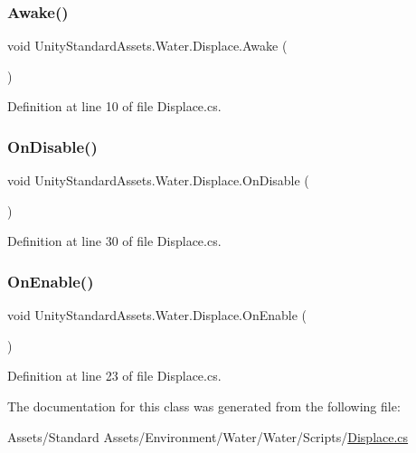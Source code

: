 \subsubsection{\texorpdfstring{Awake()}{Awake()}}
{\footnotesize\ttfamily void Unity\+Standard\+Assets.\+Water.\+Displace.\+Awake (\begin{DoxyParamCaption}{ }\end{DoxyParamCaption})}



Definition at line 10 of file Displace.\+cs.

\mbox{\label{class_unity_standard_assets_1_1_water_1_1_displace_a943603120ed56993ad8e75fa20d38b44}} 
\subsubsection{\texorpdfstring{On\+Disable()}{OnDisable()}}
{\footnotesize\ttfamily void Unity\+Standard\+Assets.\+Water.\+Displace.\+On\+Disable (\begin{DoxyParamCaption}{ }\end{DoxyParamCaption})}



Definition at line 30 of file Displace.\+cs.

\mbox{\label{class_unity_standard_assets_1_1_water_1_1_displace_aae897c2c43a2a0a34872e70d67f9ead2}} 
\subsubsection{\texorpdfstring{On\+Enable()}{OnEnable()}}
{\footnotesize\ttfamily void Unity\+Standard\+Assets.\+Water.\+Displace.\+On\+Enable (\begin{DoxyParamCaption}{ }\end{DoxyParamCaption})}



Definition at line 23 of file Displace.\+cs.



The documentation for this class was generated from the following file\+:\begin{DoxyCompactItemize}
\item 
Assets/\+Standard Assets/\+Environment/\+Water/\+Water/\+Scripts/\mbox{\hyperlink{_displace_8cs}{Displace.\+cs}}\end{DoxyCompactItemize}
